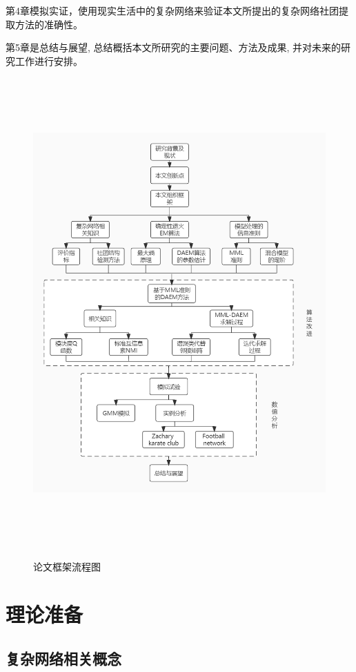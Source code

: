 \documentclass[a4paper,12pt,openany,oneside,utf-8]{ctexbook}
\newcommand{\xiaowuhao}{\fontsize{9pt}{\baselineskip}\selectfont}
\begin{document}
	第4章模拟实证，使用现实生活中的复杂网络来验证本文所提出的复杂网络社团提取方法的准确性。
	
	第5章是总结与展望, 总结概括本文所研究的主要问题、方法及成果, 并对未来的研究工作进行安排。
	
	\begin{figure}[H]
	\centering
	\includegraphics[width=150mm,height=180mm]{figure/流程图.jpg}\\
	\caption{论文框架流程图}\label{10}
    \end{figure}
	
	\chapter[理论准备]{理论准备}\fancyhead[C]{\xiaowuhao}
	\section{复杂网络相关概念}
\end{document}
